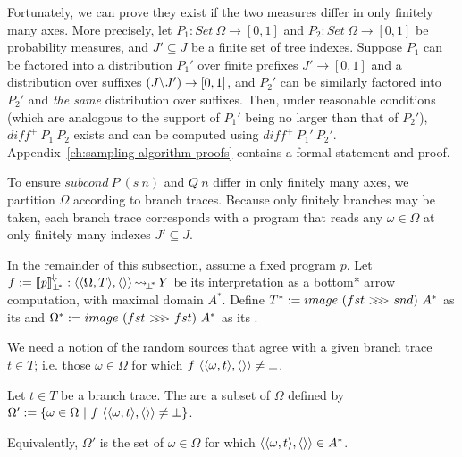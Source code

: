 Fortunately, we can prove they exist if the two measures differ in only finitely many axes.
More precisely, let $P_1 : Set~\Omega \to [0,1]$ and $P_2 : Set~\Omega \to [0,1]$ be probability measures, and $J' \subseteq J$ be a finite set of tree indexes.
Suppose $P_1$ can be factored into a distribution $P_1'$ over finite prefixes $J' \to [0,1]$ and a distribution over suffixes $(J \backslash J') \to [0,1]$, and $P_2'$ can be similarly factored into $P_2'$ and \emph{the same} distribution over suffixes.
Then, under reasonable conditions (which are analogous to the support of $P_1'$ being no larger than that of  $P_2'$), $diff^+~P_1~P_2$ exists and can be computed using $diff^+~P_1'~P_2'$.
Appendix~\ref{ch:sampling-algorithm-proofs} contains a formal statement and proof.

To ensure $subcond~P~(s~n)$ and $Q~n$ differ in only finitely many axes, we partition $\Omega$ according to branch traces.
Because only finitely branches may be taken, each branch trace corresponds with a program that reads any $\omega \in \Omega$ at only finitely many indexes $J' \subseteq J$.

In the remainder of this subsection, assume a fixed program $\mathit{p}$. Let $f := \left\llbracket{\mathit{p}}\right\rrbracket^{\mspace{-2mu}\Downarrow\mspace{-2mu}}_{\bot^{\mspace{-4mu}*}} : \langle{\langle{\Omega,T}\rangle,\langle{}\rangle}\rangle \operatorname{\rightsquigarrow_{\mspace{-3mu}{\bot^{\mspace{-4mu}*}}}} Y$ be its interpretation as a bottom* arrow computation, with maximal domain $A^*$.
Define $T^* := image~(fst~{>}\mspace{-6mu}{>}\mspace{-6mu}{>}~snd)~A^*$ as its  and
$\Omega^* := image~(fst~{>}\mspace{-6mu}{>}\mspace{-6mu}{>}~fst)~A^*$ as its .

We need a notion of the random sources that agree with a given branch trace $t \in T$; i.e. those $\omega \in \Omega$ for which $f~\langle{\langle{\omega,t}\rangle,\langle{}\rangle}\rangle \neq \bot$.

\begin{definition}
\label{def:induced-random-sources}
Let $t \in T$ be a branch trace. The  are a subset of $\Omega$ defined by
$\Omega' := \lbrace {\omega \in \Omega} \ \lvert\ {f~\langle{\langle{\omega,t}\rangle,\langle{}\rangle}\rangle \neq \bot} \rbrace$.
\end{definition}

Equivalently, $\Omega'$ is the set of $\omega \in \Omega$ for which $\langle{\langle{\omega,t}\rangle,\langle{}\rangle}\rangle \in A^*$.

